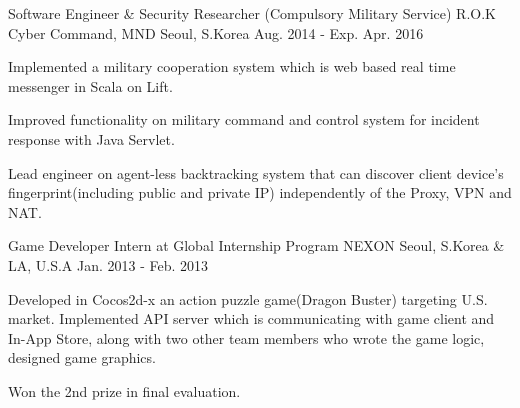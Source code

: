


\begin{cventries}


\cventry
{Software Engineer \& Security Researcher (Compulsory Military Service)} %
{R.O.K Cyber Command, MND} %
{Seoul, S.Korea} %
{Aug. 2014 - Exp. Apr. 2016} %
{ %
\begin{cvitems}
\item {Implemented a military cooperation system which is web based real time messenger in Scala on Lift.}
\item {Improved functionality on military command and control system for incident response with Java Servlet.}
\item {Lead engineer on agent-less backtracking system that can discover client device's fingerprint(including public and private IP) independently of the Proxy, VPN and NAT.}
\end{cvitems}
}


\cventry
{Game Developer Intern at Global Internship Program} %
{NEXON} %
{Seoul, S.Korea \& LA, U.S.A} %
{Jan. 2013 - Feb. 2013} %
{ %
\begin{cvitems}
\item {Developed in Cocos2d-x an action puzzle game(Dragon Buster) targeting U.S. market. Implemented API server which is communicating with game client and In-App Store, along with two other team members who wrote the game logic, designed game graphics.}
\item {Won the 2nd prize in final evaluation.}
\end{cvitems}
}


\end{cventries}